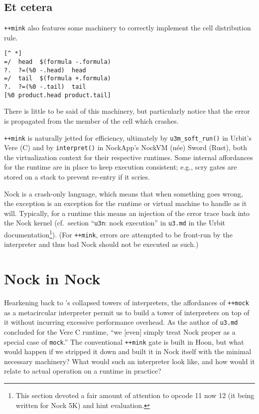 \documentclass[twoside]{article}
\begin{document}
\subsection{Et cetera}

\lstinline[style=inlinecode]{++mink} also features some machinery to correctly implement the cell distribution rule.

\begin{lstlisting}[style=listingcode]
  [^ *]
=/  head  $(formula -.formula)
?.  ?=(%0 -.head)  head
=/  tail  $(formula +.formula)
?.  ?=(%0 -.tail)  tail
[%0 product.head product.tail]
\end{lstlisting}

\noindent
There is little to be said of this machinery, but particularly notice that the error is propagated from the member of the cell which crashes.

\sloppy
\lstinline[style=inlinecode]{++mink} is naturally jetted for efficiency, ultimately by \lstinline[style=inlinecode]{u3m_soft_run()} in Urbit's Vere (C) and by \lstinline[style=inlinecode]{interpret()} in NockApp's NockVM (n\'{e}e) Sword (Rust), both the virtualization context for their respective runtimes.  Some internal affordances for the runtime are in place to keep execution consistent; e.g., scry gates are stored on a stack to prevent re-entry if it scries.

Nock is a crash-only language, which means that when something goes wrong, the exception is an exception for the runtime or virtual machine to handle as it will.  Typically, for a runtime this means an injection of the error trace back into the Nock kernel (cf.\ section ``\texttt{u3n}: nock execution'' in \texttt{u3.md} in the Urbit documentation\footnote{This section devoted a fair amount of attention to opcode 11 now 12 (it being written for Nock 5K) and hint evaluation.}).  (For \lstinline[style=inlinecode]{++mink}, errors are attempted to be front-run by the interpreter and thus bad Nock should not be executed as such.)

\section{Nock in Nock}

Hearkening back to \citeauthor{Amin2017}'s collapsed towers of interpreters, the affordances of \lstinline[style=inlinecode]{++mock} as a metacircular interpreter permit us to build a tower of interpreters on top of it without incurring excessive performance overhead.  As the author of \texttt{u3.md} concluded for the Vere C runtime, ``we [even] simply treat Nock proper as a special case of \lstinline[style=inlinecode]{mock}.''  The conventional \lstinline[style=inlinecode]{++mink} gate is built in Hoon, but what would happen if we stripped it down and built it in Nock itself with the minimal necessary machinery?  What would such an interpreter look like, and how would it relate to actual operation on a runtime in practice?
\end{document}
